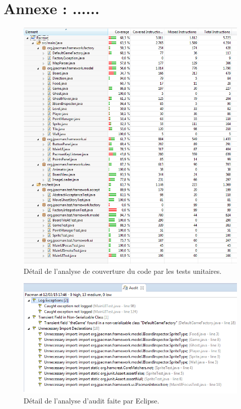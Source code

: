 \documentclass[12pt,a4paper,final]{article}
\begin{document}
\newpage
\section{Annexe : ......}\label{coverage}

\begin{figure}
	\centering
	\includegraphics[width=\textwidth]{images/CoverageTest.png}
	\caption{\label{CoverageTest}Détail de l'analyse de couverture du code par les tests unitaires.}
\end{figure}


\begin{figure}
	\centering
	\includegraphics[width=\textwidth]{images/Audit.png}
	\caption{\label{Audit}Détail de l'analyse d'audit faite par Eclipse.}
\end{figure}


\newpage


\end{document}

